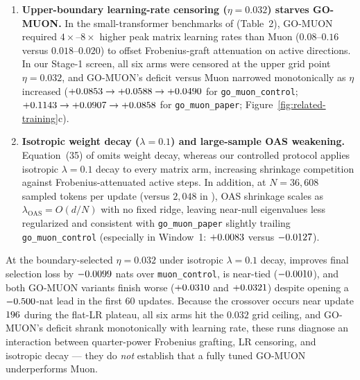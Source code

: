 \begin{enumerate}
  directions and shrinks effective step sizes along high-variance active
  directions. Notably, \citet{zhang2026mousse} independently reported that
  $\alpha = 1/4$ degrades language-model training under matched-power Frobenius
  grafting, motivating Mousse's spectral tempering to $\alpha = 1/8$.
\item \textbf{Upper-boundary learning-rate censoring ($\eta = 0.032$) starves
  GO-MUON.}
  In the small-transformer benchmarks of \citet{che2026gomuon} (Table~2),
  GO-MUON required $4\times$--$8\times$ higher peak matrix learning rates than
  Muon ($0.08$--$0.16$ versus $0.018$--$0.020$) to offset Frobenius-graft
  attenuation on active directions. In our Stage-1 screen, all six arms were
  censored at the upper grid point $\eta = 0.032$, and GO-MUON's deficit versus
  Muon narrowed monotonically as $\eta$ increased
  ($+0.0853{} \to +0.0588{} \to
  +0.0490{}$ for \texttt{go\_muon\_control};
  $+0.1143{} \to +0.0907{} \to
  +0.0858{}$ for \texttt{go\_muon\_paper};
  Figure~\ref{fig:related-training}c).
\item \textbf{Isotropic weight decay ($\lambda = 0.1$) and large-sample OAS
  weakening.}
  Equation~(35) of \citet{che2026gomuon} omits weight decay, whereas our
  controlled protocol applies isotropic $\lambda = 0.1$ decay to every matrix
  arm, increasing shrinkage competition against Frobenius-attenuated active
  steps. In addition, at $N = 36{,}608$ sampled tokens per update (versus
  $2{,}048$ in \citet{che2026gomuon}), OAS shrinkage scales as
  $\lambda_{\text{OAS}} = O(d/N)$ with no fixed ridge, leaving near-null
  eigenvalues less regularized and consistent with \texttt{go\_muon\_paper}
  slightly trailing \texttt{go\_muon\_control} (especially in Window~1:
  $+0.0083{}$ versus $-0.0127{}$).
\end{enumerate}

\begin{finding}
At the boundary-selected $\eta = 0.032$ under isotropic $\lambda = 0.1$ decay,
 improves final selection loss by $-0.0099{}$
nats over \texttt{muon\_control},  is near-tied
($-0.0010{}$), and both GO-MUON variants finish worse
($+0.0310{}$ and $+0.0321{}$) despite
opening a $-0.500{}$-nat lead in the first 60 updates. Because
the crossover occurs near update $196{}$ during the flat-LR
plateau, all six arms hit the $0.032$ grid ceiling, and GO-MUON's deficit
shrank monotonically with learning rate, these runs diagnose an interaction
between quarter-power Frobenius grafting, LR censoring, and isotropic decay ---
they do \emph{not} establish that a fully tuned GO-MUON underperforms Muon.
\end{finding}

